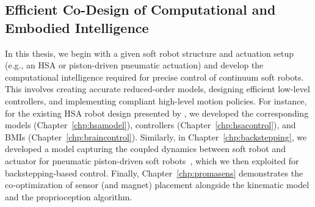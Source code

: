 \subsection{Efficient Co-Design of Computational and Embodied Intelligence}
In this thesis, we begin with a given soft robot structure and actuation setup (e.g., an \gls{HSA} or piston-driven pneumatic actuation) and develop the computational intelligence required for precise control of continuum soft robots. This involves creating accurate reduced-order models, designing efficient low-level controllers, and implementing compliant high-level motion policies. For instance, for the existing \gls{HSA} robot design presented by \citet{lipton2018handedness, chin2018compliant, truby2021recipe}, we developed the corresponding models (Chapter~\ref{chp:hsamodel}), controllers (Chapter~\ref{chp:hsacontrol}), and \glspl{BMI} (Chapter~\ref{chp:braincontrol}). Similarly, in Chapter~\ref{chp:backstepping}, we developed a model capturing the coupled dynamics between soft robot and actuator for pneumatic piston-driven soft robots~\citep{marchese2014design, marchese2016design}, which we then exploited for backstepping-based control. Finally, Chapter~\ref{chp:promasens} demonstrates the co-optimization of sensor (and magnet) placement alongside the kinematic model and the proprioception algorithm.

